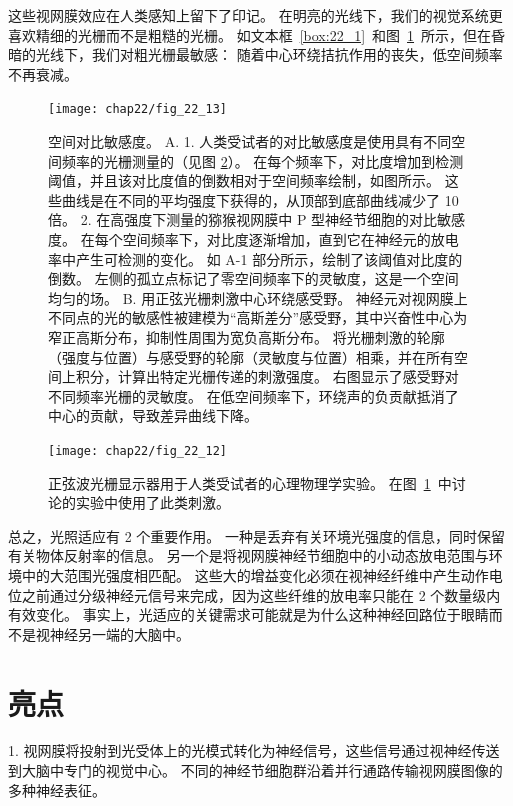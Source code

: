 这些视网膜效应在人类感知上留下了印记。
在明亮的光线下，我们的视觉系统更喜欢精细的光栅而不是粗糙的光栅。
如文本框~\ref{box:22_1}~和图~\ref{fig:22_13}~所示，但在昏暗的光线下，我们对粗光栅最敏感：
随着中心环绕拮抗作用的丧失，低空间频率不再衰减。


\begin{figure}[htbp]
	\centering
	\texttt{[image: chap22/fig\_22\_13]}
	\caption{空间对比敏感度。 
		A. 1. 人类受试者的对比敏感度是使用具有不同空间频率的光栅测量的（见图 \ref{fig:22_12}）。 
		在每个频率下，对比度增加到检测阈值，并且该对比度值的倒数相对于空间频率绘制，如图所示。 
		这些曲线是在不同的平均强度下获得的，从顶部到底部曲线减少了 10 倍\cite{de1974psychophysical}。
		2. 在高强度下测量的猕猴视网膜中 P 型神经节细胞的对比敏感度。 
		在每个空间频率下，对比度逐渐增加，直到它在神经元的放电率中产生可检测的变化。
		如 A-1 部分所示，绘制了该阈值对比度的倒数。 
		左侧的孤立点标记了零空间频率下的灵敏度，这是一个空间均匀的场\cite{derrington1984spatial}。
		B. 用正弦光栅刺激中心环绕感受野。
		神经元对视网膜上不同点的光的敏感性被建模为“高斯差分”感受野，其中兴奋性中心为窄正高斯分布，抑制性周围为宽负高斯分布。
		将光栅刺激的轮廓（强度与位置）与感受野的轮廓（灵敏度与位置）相乘，并在所有空间上积分，计算出特定光栅传递的刺激强度。
		右图显示了感受野对不同频率光栅的灵敏度。
		在低空间频率下，环绕声的负贡献抵消了中心的贡献，导致差异曲线下降\cite{enroth1984functional}。}
	\label{fig:22_13}
\end{figure}


\begin{figure}[htbp]
	\centering
	\texttt{[image: chap22/fig\_22\_12]}
	\caption{正弦波光栅显示器用于人类受试者的心理物理学实验。
		在图~\ref{fig:22_13}~中讨论的实验中使用了此类刺激。}
	\label{fig:22_12}
\end{figure}


总之，光照适应有 2 个重要作用。
一种是丢弃有关环境光强度的信息，同时保留有关物体反射率的信息。
另一个是将视网膜神经节细胞中的小动态放电范围与环境中的大范围光强度相匹配。
这些大的增益变化必须在视神经纤维中产生动作电位之前通过分级神经元信号来完成，因为这些纤维的放电率只能在 2 个数量级内有效变化。
事实上，光适应的关键需求可能就是为什么这种神经回路位于眼睛而不是视神经另一端的大脑中。



\section{亮点}

1. 视网膜将投射到光受体上的光模式转化为神经信号，这些信号通过视神经传送到大脑中专门的视觉中心。 
不同的神经节细胞群沿着并行通路传输视网膜图像的多种神经表征。



